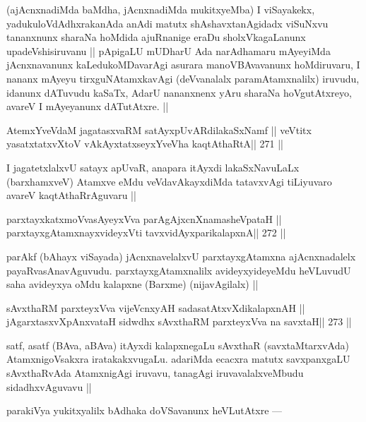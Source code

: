 \begin{artha}
(ajAcnxnadiMda baMdha, jAcnxnadiMda mukitxyeMba) I viSayakekx, yadukuloVdAdhxrakanAda anAdi matutx shAshavxtanAgidadx viSuNxvu tananxnunx sharaNa hoMdida ajuRnanige eraDu sholxVkagaLanunx upadeVshisiruvanu || pApigaLU mUDharU Ada narAdhamaru mAyeyiMda jAcnxnavanunx kaLedukoMDavarAgi asurara manoVBAvavanunx hoMdiruvaru, I nananx mAyeyu tirxguNAtamxkavAgi (deVvanalalx paramAtamxnalilx) iruvudu, idanunx dATuvudu kaSaTx, AdarU nananxnenx yAru sharaNa hoVgutAtxreyo, avareV I mAyeyanunx dATutAtxre. ||
\end{artha}


\begin{shl}
AtemxYveVdaM jagatasxvaRM satAyxpUvARdilakaSxNamf ||
veVtitx yasatxtatxvXtoV vAkAyxtatxseyxYveVha kaqtAthaRtA\hfill || 271 ||
\end{shl}

\begin{artha}
I jagatetxlalxvU satayx apUvaR, anapara itAyxdi lakaSxNavuLaLx 
(barxhamxveV) Atamxve eMdu veVdavAkayxdiMda tatavxvAgi tiLiyuvaro avareV kaqtAthaRrAguvaru ||
\end{artha}

\begin{shl}
parxtayxkatxmoVvasAyeyxVva parAgAjxcnXnamasheVpataH ||
parxtayxgAtamxnayxvideyxVti tavxvidAyxparikalapxnA\hfill || 272 ||
\end{shl}

\begin{artha}
parAkf (bAhayx viSayada) jAcnxnavelalxvU parxtayxgAtamxna 
ajAcnxnadalelx payaRvasAnavAguvudu. parxtayxgAtamxnalilx avideyxyideyeMdu heVLuvudU saha avideyxya oMdu kalapxne (Barxme) (nijavAgilalx) ||
\end{artha}

\begin{shl}
sAvxthaRM parxteyxVva vijeVcnxyAH sadasatAtxvXdikalapxnAH ||
jAgarxtasxvXpAnxvataH sidwdhx sAvxthaRM parxteyxVva na savxtaH\hfill || 273 ||
\end{shl}

\begin{artha}
satf, asatf (BAva, aBAva) itAyxdi kalapxnegaLu sAvxthaR 
(savxtaMtarxvAda) AtamxnigoVsakxra iratakakxvugaLu. adariMda ecacxra 
matutx savxpanxgaLU sAvxthaRvAda AtamxnigAgi iruvavu, tanagAgi iruvavalalxveMbudu sidadhxvAguvavu ||
\end{artha}

\begin{artha}
parakiVya yukitxyalilx bAdhaka doVSavanunx heVLutAtxre ---
\end{artha}

